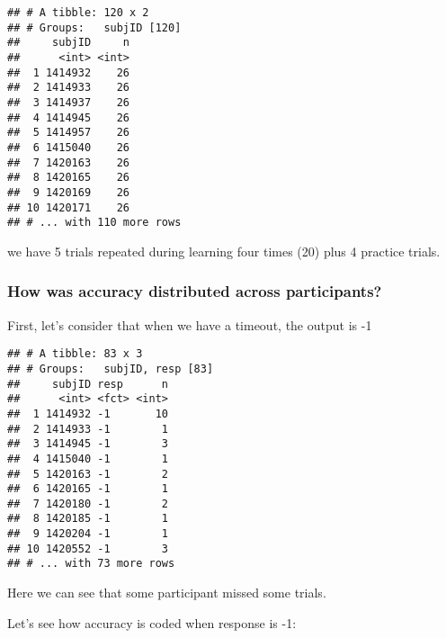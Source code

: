 \documentclass[
]{article}
\newenvironment{Shaded}{\begin{snugshade}}{\end{snugshade}}
\newcommand{\DecValTok}[1]{\textcolor[rgb]{0.00,0.00,0.81}{#1}}
\newcommand{\KeywordTok}[1]{\textcolor[rgb]{0.13,0.29,0.53}{\textbf{#1}}}
\newcommand{\NormalTok}[1]{#1}
\newcommand{\OperatorTok}[1]{\textcolor[rgb]{0.81,0.36,0.00}{\textbf{#1}}}
\newcommand{\StringTok}[1]{\textcolor[rgb]{0.31,0.60,0.02}{#1}}
\begin{document}
\begin{verbatim}
## # A tibble: 120 x 2
## # Groups:   subjID [120]
##     subjID     n
##      <int> <int>
##  1 1414932    26
##  2 1414933    26
##  3 1414937    26
##  4 1414945    26
##  5 1414957    26
##  6 1415040    26
##  7 1420163    26
##  8 1420165    26
##  9 1420169    26
## 10 1420171    26
## # ... with 110 more rows
\end{verbatim}

we have 5 trials repeated during learning four times (20) plus 4
practice trials.

\hypertarget{how-was-accuracy-distributed-across-participants}{%
\subsubsection{How was accuracy distributed across
participants?}\label{how-was-accuracy-distributed-across-participants}}

First, let's consider that when we have a timeout, the output is -1

\begin{Shaded}
\end{Shaded}

\begin{verbatim}
## # A tibble: 83 x 3
## # Groups:   subjID, resp [83]
##     subjID resp      n
##      <int> <fct> <int>
##  1 1414932 -1       10
##  2 1414933 -1        1
##  3 1414945 -1        3
##  4 1415040 -1        1
##  5 1420163 -1        2
##  6 1420165 -1        1
##  7 1420180 -1        2
##  8 1420185 -1        1
##  9 1420204 -1        1
## 10 1420552 -1        3
## # ... with 73 more rows
\end{verbatim}

Here we can see that some participant missed some trials.

Let's see how accuracy is coded when response is -1:

\begin{Shaded}
\end{Shaded}
\end{document}
